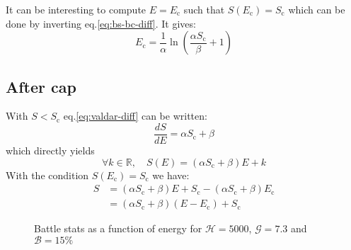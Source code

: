 \documentclass[12pt]{article}
\def\happy{\mathcal{H}}
\def\gym{\mathcal{G}}
\def\bonus{\mathcal{B}}
\def\Sc{S_\text{c}}
\def\Ec{E_\text{c}}
\begin{document}
It can be interesting to compute $E=\Ec$ such that $S(\Ec)=\Sc$ which can be done by inverting eq.\eqref{eq:bs-bc-diff}. It gives:
\begin{equation}
    \Ec = \frac{1}{\alpha}\ln\left(\frac{\alpha \Sc}{\beta} +1 \right)
\end{equation}

\subsection{After cap}
With $S<\Sc$ eq.\eqref{eq:valdar-diff} can be written:
\begin{equation}
    \frac{dS}{dE}  = \alpha \Sc + \beta
\end{equation}
which directly yields
\begin{equation}
    \forall k \in \mathbb{R},\quad S(E)  = (\alpha \Sc + \beta) E + k
\end{equation}
With the condition $S(\Ec)=\Sc$ we have:
\begin{equation}
    \begin{aligned}
        S & = (\alpha \Sc + \beta)E + \Sc - (\alpha \Sc + \beta) \Ec \\
          & = (\alpha \Sc + \beta) (E - \Ec) + \Sc
    \end{aligned}
\end{equation}

\begin{figure}[!h]
    \centering

    \caption{Battle stats as a function of energy for $\happy = 5000$, $\gym = 7.3$ and $\bonus= 15\%$}
\end{figure}
\end{document}
